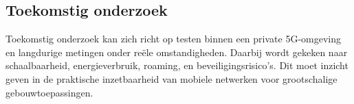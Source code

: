 \documentclass[a0,portrait]{hogent-poster}
\begin{document}
\begin{multicols}{2}
\section{Toekomstig onderzoek}

Toekomstig onderzoek kan zich richt op testen binnen een private 5G-omgeving en langdurige metingen onder reële omstandigheden. Daarbij wordt gekeken naar schaalbaarheid, energieverbruik, roaming, en beveiligingsrisico’s. Dit moet inzicht geven in de praktische inzetbaarheid van mobiele netwerken voor grootschalige gebouwtoepassingen.\newline\newline\newline\newline\newline\newline\newline

\end{multicols}
\end{document}
